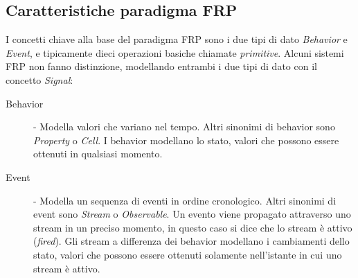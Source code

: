 \documentclass[../main.tex]{subfiles}
\begin{document}
\subsection{Caratteristiche paradigma FRP}
I concetti chiave alla base del paradigma FRP sono i due tipi di dato \textit{Behavior} e \textit{Event}, e tipicamente dieci operazioni basiche chiamate \textit{primitive}. Alcuni sistemi FRP non fanno distinzione, modellando entrambi i due tipi di dato con il concetto \textit{Signal}:
\begin{description}
    \item[Behavior] - Modella valori che variano nel tempo. Altri sinonimi di behavior sono \textit{Property} o \textit{Cell}. I behavior modellano lo stato, valori che possono essere ottenuti in qualsiasi momento.
    \item[Event] - Modella un sequenza di eventi in ordine cronologico. Altri sinonimi di event sono \textit{Stream} o \textit{Observable}. Un evento viene propagato attraverso uno stream in un preciso momento, in questo caso si dice che lo stream è attivo (\textit{fired}). Gli stream a differenza dei behavior modellano i cambiamenti dello stato, valori che possono essere ottenuti solamente nell'istante in cui uno stream è attivo.
\end{description}
\end{document}
